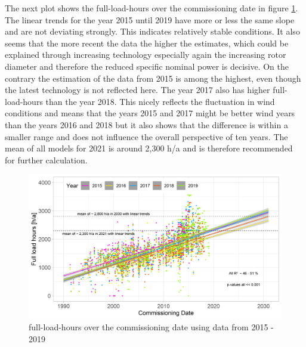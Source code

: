 \documentclass[a4paper,11pt]{article}
\begin{document}
The next plot shows the full-load-hours over the commissioning date in figure \ref{fig:full}. The linear trends for the year 2015 until 2019 have more or less the same slope and are not deviating strongly. This indicates relatively stable conditions. It also seems that the more recent the data the higher the estimates, which could be explained through increasing technology especially again the increasing rotor diameter and therefore the reduced specific nominal power is decisive. On the contrary the estimation of the data from 2015 is among the highest, even though the latest technology is not reflected here. The year 2017 also has higher full-load-hours than the year 2018. This nicely reflects the fluctuation in wind conditions and means that the years 2015 and 2017 might be better wind years than the years 2016 and 2018 but it also shows that the difference is within a smaller range and does not influence the overall perspective of ten years. The mean of all models for 2021 is around 2,300 h/a and is therefore recommended for further calculation.
\begin{figure}[H]

{\centering \includegraphics[width=1\linewidth]{data/Amprion/results_of_analysis/flh} 

}

\caption{full-load-hours over the commissioning date using data from 2015 - 2019}\label{fig:full}
\end{figure}
\end{document}
